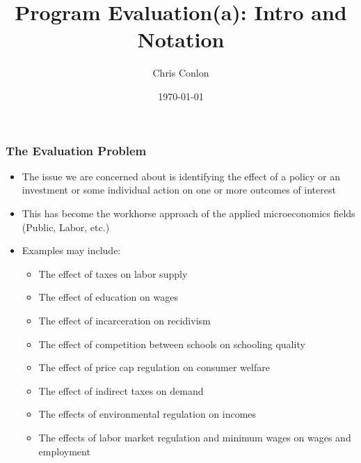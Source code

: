 \documentclass[aspectratio=169,11pt]{beamer}
\title{Program Evaluation(a): Intro and Notation}
\author{Chris Conlon}
\institute{Applied Econometrics}
\date{\today}
\begin{document}
\frame{\titlepage}


\begin{frame}
\frametitle{The Evaluation Problem}
\begin{itemize}
\item The issue we are concerned about is identifying the effect of a policy or an investment or some individual action on one or more outcomes of interest
\item This has become the workhorse approach of the applied microeconomics fields (Public, Labor, etc.)
\item Examples may include:
\begin{itemize}
\item The effect of taxes on labor supply
\item The effect of education on wages
\item The effect of incarceration on recidivism
\item The effect of competition between schools on schooling quality
\item The effect of price cap regulation on consumer welfare
\item The effect of indirect taxes on demand
\item The effects of environmental regulation on incomes
\item The effects of labor market regulation and minimum wages on wages and employment
\end{itemize}
\end{itemize}
\end{frame}
\end{document}
